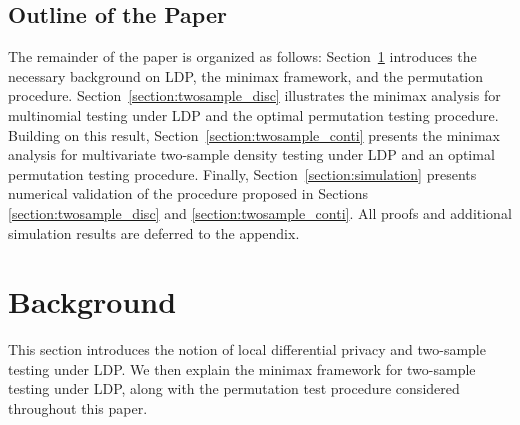 \documentclass[twoside,11pt]{article}
\begin{document}
\subsection{Outline of the Paper}
The remainder of the paper is organized as follows:
Section~\ref{section:background} introduces the necessary background on LDP, the minimax framework, and the permutation procedure.
Section~\ref{section:twosample_disc} illustrates the minimax analysis for multinomial testing under LDP and the optimal permutation testing procedure.
Building on this result, Section~\ref{section:twosample_conti} presents the minimax analysis for multivariate two-sample density testing under LDP and an optimal permutation testing procedure.
Finally, Section~\ref{section:simulation} presents numerical validation of the procedure proposed in Sections \ref{section:twosample_disc} and \ref{section:twosample_conti}. All proofs and additional simulation results are deferred to the appendix.
%
\section{Background}\label{section:background}
This section introduces the notion of local differential privacy and two-sample testing under LDP. We then explain the minimax framework for two-sample testing under LDP, along with the permutation test procedure considered throughout this paper. 
%
\end{document}
